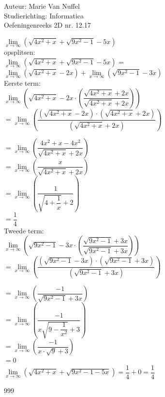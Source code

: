 \documentclass[a4paper]{article}
\begin{document}
  
\noindent \large Auteur: Marie Van Nuffel \\
\noindent \large Studierichting: Informatica\\
\noindent \large Oefeningenreeks 2D nr. 12.17\\

\medskip

\normalsize

$\lim\limits_{x\rightarrow \infty}(\sqrt{4x^2+x}+\sqrt{9x^2-1}-5x)$\\

opsplitsen:\\

$\lim\limits_{x\rightarrow \infty}(\sqrt{4x^2+x}+\sqrt{9x^2-1}-5x)$ = $\lim\limits_{x\rightarrow \infty}(\sqrt{4x^2+x} -2x) + \lim\limits_{x\rightarrow \infty}(\sqrt{9x^2-1} -3x)$\\

Eerste term:\\

$\lim\limits_{x\rightarrow \infty}\left( \sqrt{4x^2+x}-2x\cdot \left(\dfrac{\sqrt{4x^2+x}+2x}{\sqrt{4x^2+x}+2x}\right)\right)$\\

$= \lim\limits_{x\rightarrow \infty}\left( \dfrac{(\sqrt{4x^2+x}-2x)\cdot(\sqrt{4x^2+x}+2x)}{(\sqrt{4x^2+x}+2x)}\right)$

$= \lim\limits_{x\rightarrow \infty}\left( \dfrac{4x^2+x-4x^2}{\sqrt{4x^2+x}+2x}\right)$\\

$= \lim\limits_{x\rightarrow \infty}\left( \dfrac{x}{\sqrt{4x^2+x}+2x}\right)$\\

$= \lim\limits_{x\rightarrow \infty}\left( \dfrac{1}{\sqrt{4+\dfrac{1}{x}}+2}\right)$\\

$= \dfrac{1}{4}$\\

Tweede term:\\

$\lim\limits_{x\rightarrow \infty}\left( \sqrt{9x^2-1}-3x\cdot \left(\dfrac{\sqrt{9x^2-1}+3x}{\sqrt{9x^2-1}+3x}\right)\right)$\\

$= \lim\limits_{x\rightarrow \infty}\left(\dfrac{(\sqrt{9x^2-1}-3x)\cdot(\sqrt{9x^2-1}+3x)}{(\sqrt{9x^2-1}+3x)}\right)$

$= \lim\limits_{x\rightarrow \infty}\left(\dfrac{-1}{\sqrt{9x^2-1}+3x}\right)$\\

$= \lim\limits_{x\rightarrow \infty}\left(\dfrac{-1}{x\sqrt{9-\dfrac{1}{x^2}}+3}\right)$\\

$= \lim\limits_{x\rightarrow \infty}\left(\dfrac{-1}{x\cdot\sqrt{9}+3}\right)$\\

$= 0$\\

$\lim\limits_{x\rightarrow \infty}(\sqrt{4x^2+x}+\sqrt{9x^2-1-5x}) = \dfrac{1}{4} + 0 = \dfrac{1}{4}$\\

\begin{thebibliography}{999}
\end{thebibliography}
\end{document}
